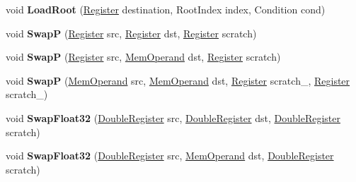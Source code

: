 \begin{DoxyCompactItemize}
\item 
\mbox{\label{classv8_1_1internal_1_1TurboAssembler_ab5f222dfec68bd46c53fdb0d34589b4d}} 
void {\bfseries Load\+Root} (\mbox{\hyperlink{classv8_1_1internal_1_1Register}{Register}} destination, Root\+Index index, Condition cond)
\item 
\mbox{\label{classv8_1_1internal_1_1TurboAssembler_a8076613a4345a1cb21f1fd4e9c72b2b8}} 
void {\bfseries SwapP} (\mbox{\hyperlink{classv8_1_1internal_1_1Register}{Register}} src, \mbox{\hyperlink{classv8_1_1internal_1_1Register}{Register}} dst, \mbox{\hyperlink{classv8_1_1internal_1_1Register}{Register}} scratch)
\item 
\mbox{\label{classv8_1_1internal_1_1TurboAssembler_aaf891710bb12ef5942050f3aa0aba809}} 
void {\bfseries SwapP} (\mbox{\hyperlink{classv8_1_1internal_1_1Register}{Register}} src, \mbox{\hyperlink{classv8_1_1internal_1_1MemOperand}{Mem\+Operand}} dst, \mbox{\hyperlink{classv8_1_1internal_1_1Register}{Register}} scratch)
\item 
\mbox{\label{classv8_1_1internal_1_1TurboAssembler_a257c0ae0f89a471ac927cf67f9483bd0}} 
void {\bfseries SwapP} (\mbox{\hyperlink{classv8_1_1internal_1_1MemOperand}{Mem\+Operand}} src, \mbox{\hyperlink{classv8_1_1internal_1_1MemOperand}{Mem\+Operand}} dst, \mbox{\hyperlink{classv8_1_1internal_1_1Register}{Register}} scratch\+\_, \mbox{\hyperlink{classv8_1_1internal_1_1Register}{Register}} scratch\+\_)
\item 
\mbox{\label{classv8_1_1internal_1_1TurboAssembler_ac9202664a998d9858c2df04ab4cc2b2d}} 
void {\bfseries Swap\+Float32} (\mbox{\hyperlink{classv8_1_1internal_1_1DoubleRegister}{Double\+Register}} src, \mbox{\hyperlink{classv8_1_1internal_1_1DoubleRegister}{Double\+Register}} dst, \mbox{\hyperlink{classv8_1_1internal_1_1DoubleRegister}{Double\+Register}} scratch)
\item 
\mbox{\label{classv8_1_1internal_1_1TurboAssembler_a41506f06d21b8d3c2a359fc73e5bf1b6}} 
void {\bfseries Swap\+Float32} (\mbox{\hyperlink{classv8_1_1internal_1_1DoubleRegister}{Double\+Register}} src, \mbox{\hyperlink{classv8_1_1internal_1_1MemOperand}{Mem\+Operand}} dst, \mbox{\hyperlink{classv8_1_1internal_1_1DoubleRegister}{Double\+Register}} scratch)

\end{DoxyCompactItemize}
